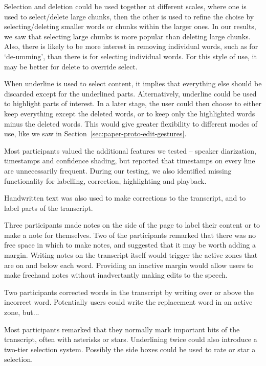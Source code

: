 Selection and deletion could be used together at different scales, where one is used to select/delete large chunks,
then the other is used to refine the choise by selecting/deleting smaller words or chunks within the larger ones. In
our results, we saw that selecting large chunks is more popular than deleting large chunks. Also, there is likely to be
more interest in removing individual words, such as for `de-umming', than there is for selecting individual words. For
this style of use, it may be better for delete to override select.

When underline is used to select content, it implies that everything else should be discarded except for the underlined
parts. Alternatively, underline could be used to highlight parts of interest. In a later stage, the user could then
choose to either keep everything except the deleted words, or to keep only the highlighted words minus the deleted
words. This would give greater flexibility to different modes of use, like we saw in
Section~\ref{sec:paper-proto-edit-gestures}.

Most participants valued the additional features we tested -- speaker diarization, timestamps and confidence shading,
but reported that timestamps on every line are unnecessarily frequent. During our testing, we also identified missing
functionality for labelling, correction, highlighting and playback.

Handwritten text was also used to make
corrections to the transcript, and to label parts of the transcript.

Three participants made notes on the side of the page to label their content or to make a note for themselves. Two of
the participants remarked that there was no free space in which to make notes, and suggested that it may be worth
adding a margin. Writing notes on the transcript itself would trigger the active zones that are on and below each word.
Providing an inactive margin would allow users to make freehand notes without inadvertantly making edits to the speech.

Two participants corrected words in the transcript by writing over or above the incorrect word. 
Potentially users could write the replacement word in an active zone, but...

Most participants remarked that they normally mark important bits of the transcript, often with asterisks or
stars. Underlining twice could also introduce a two-tier selection system.
Possibly the side boxes could be used to rate or star a selection.

